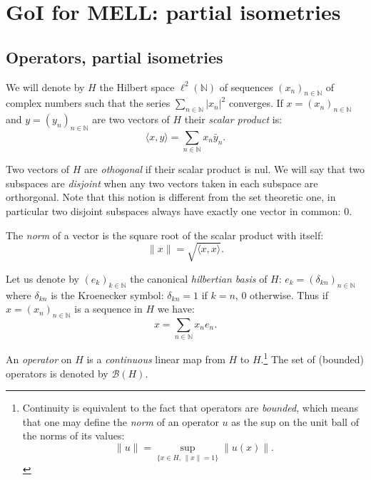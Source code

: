 \section{GoI for MELL: partial isometries}\label{goi-for-mell-partial-isometries}


\subsection{Operators, partial isometries}\label{operators-partial-isometries}

We will denote by \(H\) the Hilbert space \(\ell^2(\mathbb{N})\) of
sequences \((x_n)_{n\in\mathbb{N}}\) of complex numbers such that the
series \(\sum_{n\in\mathbb{N}}|x_n|^2\) converges. If
\(x = (x_n)_{n\in\mathbb{N}}\) and \(y = (y_n)_{n\in\mathbb{N}}\) are
two vectors of \(H\) their \emph{scalar product} is:
\begin{equation*}
\langle x, y\rangle = \sum_{n\in\mathbb{N}} x_n\bar y_n.
\end{equation*}

Two vectors of \(H\) are \emph{othogonal} if their scalar product is
nul. We will say that two subspaces are \emph{disjoint} when any two
vectors taken in each subspace are orthorgonal. Note that this notion is
different from the set theoretic one, in particular two disjoint
subspaces always have exactly one vector in common: \(0\).

The \emph{norm} of a vector is the square root of the scalar product
with itself:
\begin{equation*}
\|x\| = \sqrt{\langle x, x\rangle}.
\end{equation*}

Let us denote by \((e_k)_{k\in\mathbb{N}}\) the canonical
\emph{hilbertian basis} of \(H\):
\(e_k = (\delta_{kn})_{n\in\mathbb{N}}\) where \(\delta_{kn}\) is the
Kroenecker symbol: \(\delta_{kn}=1\) if \(k=n\), \(0\) otherwise. Thus
if \(x=(x_n)_{n\in\mathbb{N}}\) is a sequence in \(H\) we have:
\begin{equation*}
x = \sum_{n\in\mathbb{N}} x_ne_n.
\end{equation*}

An \emph{operator} on \(H\) is a \emph{continuous} linear map from \(H\)
to \(H\).\footnote{Continuity is equivalent to the fact that operators are
\emph{bounded}, which means that one may define the \emph{norm} of an
operator \(u\) as the sup on the unit ball of the norms of its values:
\begin{equation*}
\|u\| = \sup_{\{x\in H,\, \|x\| = 1\}}\|u(x)\|.
\end{equation*}}
The set of (bounded) operators is denoted by \(\mathcal{B}(H)\).

